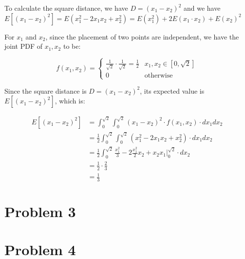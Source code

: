 \documentclass[12pt]{article}
\begin{document}
To calculate the square distance, we have $D = (x_1 - x_2) ^ 2$ and we have $E[(x_1 - x_2)^2] = E(x^2_1 - 2x_1x_2 +  x^2_2) =  E(x_1^2) + 2E(x_1\cdot x_2) + E(x_2)^2$

For $x_1$ and $x_2$, since the placement of two points are independent, we have the joint PDF of $x_1, x_2$ to be:

\[ f(x_1,x_2) = \begin{cases}
      \frac{1}{\sqrt{2}} \cdot \frac{1}{\sqrt{2}} = \frac{1}{2} & x_1, x_2 \in [0, \sqrt{2}]\\
      0 & \text{otherwise}
   \end{cases}
\]

Since the square distance is $D = (x_1 - x_2) ^ 2$, its expected value is $E[(x_1 - x_2)^2]$, which is:

\begin{align*}
    E[(x_1 - x_2)^2] &=   \int^{\sqrt{2}}_{0} \int^{\sqrt{2}}_{0} (x_1 - x_2)^2 \cdot f(x_1, x_2) \cdot dx_1 dx_2 \\
    &= \frac{1}{2} \int^{\sqrt{2}}_{0} \int^{\sqrt{2}}_{0} (x_1^2 - 2 x_1 x_2 + x_2^2) \cdot dx_1 dx_2 \\
    &= \frac{1}{2} \int^{\sqrt{2}}_{0}  \frac{x_1^2}{3} - 2\frac{x_1^2}{2}x_2 + x_2 x_1 \Big|^{\sqrt{2}}_{0} \cdot dx_2\\
    &= \frac{1}{2} \cdot \frac{2}{3} \\
    &= \frac{1}{3}
\end{align*}

\section{Problem 3}

\section{Problem 4}


% 
% 
\end{document}
